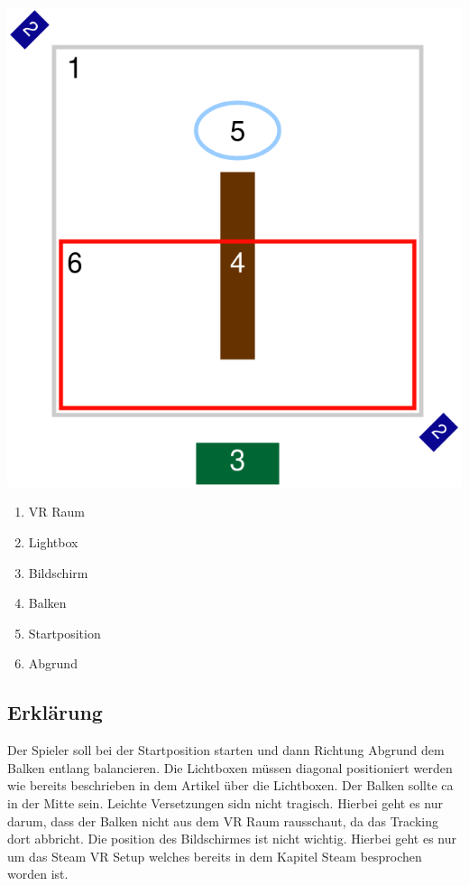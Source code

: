 \includegraphics[scale=0.5]{pics/assemlbly.png}
\begin{enumerate}
    \item VR Raum
    \item Lightbox
    \item Bildschirm
    \item Balken
    \item Startposition
    \item Abgrund
\end{enumerate}

\subsection{Erklärung}\label{subsec:description}

Der Spieler soll bei der Startposition starten und dann Richtung Abgrund dem Balken entlang balancieren.
Die Lichtboxen müssen diagonal positioniert werden wie bereits beschrieben in dem Artikel über die Lichtboxen.
Der Balken sollte ca in der Mitte sein.
Leichte Versetzungen sidn nicht tragisch. Hierbei geht es nur darum, dass der Balken nicht aus dem VR Raum
rausschaut, da das Tracking dort abbricht. Die position des Bildschirmes ist nicht wichtig.
Hierbei geht es nur um das Steam VR Setup welches bereits in dem Kapitel Steam besprochen worden ist.

